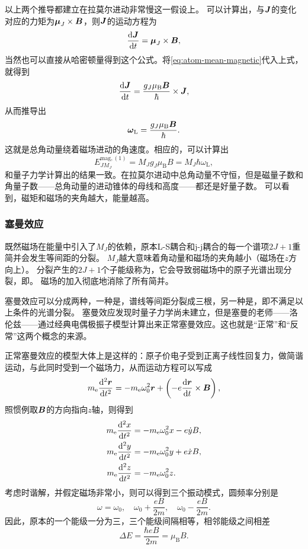 以上两个推导都建立在拉莫尔进动非常慢这一假设上。
可以计算出，与$\vb*{J}$的变化对应的力矩为$\vb*{\mu}_J \times \vb*{B}$，则$\vb*{J}$的运动方程为
\[
    \dv{\vb*{J}}{t} = \vb*{\mu}_J \times \vb*{B},
\]
当然也可以直接从哈密顿量得到这个公式。将\eqref{eq:atom-mean-magnetic}代入上式，就得到
\[
    \dv{\vb*{J}}{t} = \frac{g_J \mu_\text{B} \vb*{B}}{\hbar} \times \vb*{J},
\]
从而推导出
\begin{equation}
    \vb*{\omega}_\text{L} = \frac{g_J \mu_\text{B} \vb*{B}}{\hbar}.
\end{equation}
这就是总角动量绕着磁场进动的角速度。相应的，可以计算出
\begin{equation}
    E^{\text{mag}, (1)}_{JM_J} = M_J g_J \mu_\text{B} B = M_J \hbar \omega_\text{L},
    \label{eq:small-magnetic-gapping}
\end{equation}
和量子力学计算出的结果一致。在拉莫尔进动中总角动量不守恒，但是磁量子数和角量子数——总角动量的进动锥体的母线和高度——都还是好量子数。
可以看到，磁矩和磁场的夹角越大，能量越高。

\subsubsection{塞曼效应}

既然磁场在能量中引入了$M_J$的依赖，原本L-S耦合和j-j耦合的每一个谱项$2J+1$重简并会发生等间距的分裂。
$M_J$越大意味着角动量和磁场的夹角越小（磁场在$z$方向上）。
分裂产生的$2J+1$个子能级称为，它会导致弱磁场中的原子光谱出现分裂，即。
磁场的加入彻底地消除了所有简并。

塞曼效应可以分成两种，一种是，谱线等间距分裂成三根，另一种是，即不满足以上条件的光谱分裂。
塞曼效应发现时量子力学尚未建立，但是塞曼的老师——洛伦兹——通过经典电偶极振子模型计算出来正常塞曼效应。这也就是“正常”和“反常”这两个概念的来源。

正常塞曼效应的模型大体上是这样的：原子价电子受到正离子线性回复力，做简谐运动，与此同时受到一个磁场力，从而运动方程可以写成
\begin{equation}
    m_\text{e} \dv[2]{\vb*{r}}{t} = - m_\text{e} \omega_0^2 \vb*{r} + \left( - e \dv{\vb*{r}}{t} \times \vb*{B} \right),
\end{equation}
照惯例取$\vb*{B}$的方向指向$z$轴，则得到
\[
    \begin{aligned}
        m_\text{e} \dv[2]{x}{t} &= - m_\text{e} \omega_0^2 x - e \dot{y} B, \\
        m_\text{e} \dv[2]{y}{t} &= - m_\text{e} \omega_0^2 y + e \dot{x} B, \\
        m_\text{e} \dv[2]{z}{t} &= - m_\text{e} \omega_0^2 z.
    \end{aligned}
\]
考虑时谐解，并假定磁场非常小，则可以得到三个振动模式，圆频率分别是
\begin{equation}
    \omega = \omega_0, \quad \omega_0 + \frac{eB}{2m}, \quad \omega_0 - \frac{eB}{2m}.
\end{equation}
因此，原本的一个能级一分为三，三个能级间隔相等，相邻能级之间相差
\begin{equation}
    \Delta E = \frac{\hbar eB}{2m} = \mu_\text{B} B.
\end{equation}


